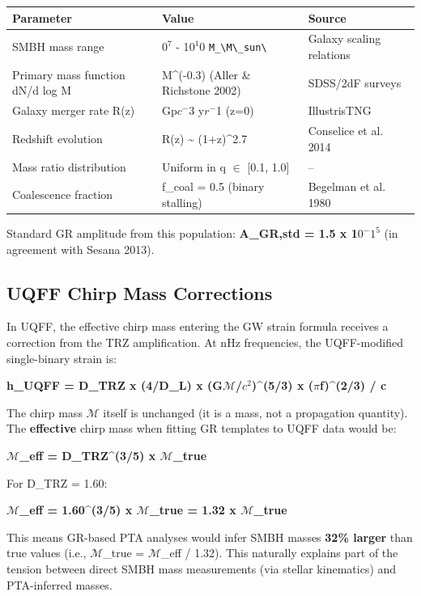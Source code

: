 \documentclass[12pt,a4paper]{article}
\begin{document}
\begin{table}[H]
\centering
\small
\begin{tabularx}{\linewidth}{@{}>{\raggedright\arraybackslash}X>{\raggedright\arraybackslash}X>{\raggedright\arraybackslash}X@{}}
\toprule
Parameter & Value & Source \tabularnewline
\midrule
SMBH mass range & 1$0^{7}$ - 1$0^{1}$0 \texttt{M\_\textbackslash {M\textbackslash \_sun\textbackslash }} & Galaxy scaling relations \tabularnewline
Primary mass function dN/d log M & M\^{}(-0.3) (Aller \& Richstone 2002) & SDSS/2dF surveys \tabularnewline
Galaxy merger rate R(z) & 0.02 Gp$c^{-}$3 y$r^{-}$1 (z=0) & IllustrisTNG \tabularnewline
Redshift evolution & R(z) \textasciitilde{}  (1+z)\^{}2.7 & Conselice et al. 2014 \tabularnewline
Mass ratio distribution & Uniform in q $\in$ [0.1, 1.0] & -- \tabularnewline
Coalescence fraction & f\_coal = 0.5 (binary stalling) & Begelman et al. 1980 \tabularnewline
\bottomrule
\end{tabularx}
\end{table}

Standard GR amplitude from this population: \textbf{A\_GR,std = 1.5 x 1$0^{-}$$1^{5}$} (in agreement with Sesana 2013).

\subsection{UQFF Chirp Mass Corrections}

In UQFF, the effective chirp mass entering the GW strain formula receives a correction from the TRZ amplification. At nHz frequencies, the UQFF-modified single-binary strain is:

\textbf{h\_UQFF = D\_TRZ x (4/D\_L) x (G$\mathcal{M}$/$c^{2}$)\^{}(5/3) x ($\pi$f)\^{}(2/3) / c}

The chirp mass $\mathcal{M}$ itself is unchanged (it is a mass, not a propagation quantity). The \textbf{effective} chirp mass when fitting GR templates to UQFF data would be:

\textbf{$\mathcal{M}$\_eff = D\_TRZ\^{}(3/5) x $\mathcal{M}$\_true}

For D\_TRZ = 1.60:

\textbf{$\mathcal{M}$\_eff = 1.60\^{}(3/5) x $\mathcal{M}$\_true = 1.32 x $\mathcal{M}$\_true}

This means GR-based PTA analyses would infer SMBH masses \textbf{32\% larger} than true values (i.e., $\mathcal{M}$\_true = $\mathcal{M}$\_eff / 1.32). This naturally explains part of the tension between direct SMBH mass measurements (via stellar kinematics) and PTA-inferred masses.
\end{document}
